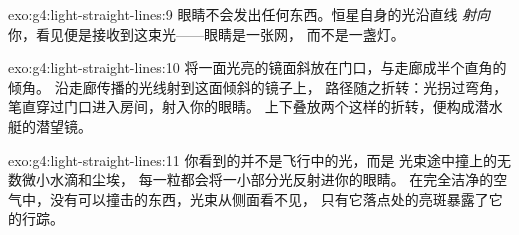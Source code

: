 \begin{solution}{exo:g4:light-straight-lines:9}
眼睛不会发出任何东西。恒星自身的光沿直线
\emph{射向}你，看见便是接收到这束光——眼睛是一张网，
而不是一盏灯。
\end{solution}

\begin{solution}{exo:g4:light-straight-lines:10}
将一面光亮的镜面斜放在门口，与走廊成半个直角的倾角。
沿走廊传播的光线射到这面倾斜的镜子上，
路径随之折转：光拐过弯角，
笔直穿过门口进入房间，射入你的眼睛。
上下叠放两个这样的折转，便构成潜水艇的潜望镜。
\end{solution}

\begin{solution}{exo:g4:light-straight-lines:11}
你看到的并不是飞行中的光，而是
光束途中撞上的无数微小水滴和尘埃，
每一粒都会将一小部分光反射进你的眼睛。
在完全洁净的空气中，没有可以撞击的东西，光束从侧面看不见，
只有它落点处的亮斑暴露了它的行踪。
\end{solution}
